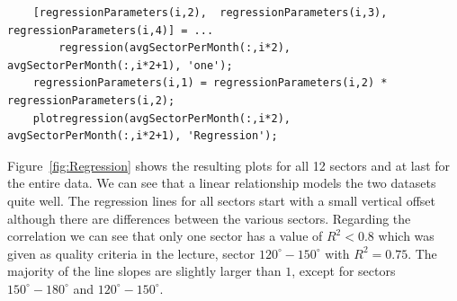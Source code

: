 \documentclass[10pt]{article}
\begin{document}
\begin{lstlisting}
    [regressionParameters(i,2),  regressionParameters(i,3), regressionParameters(i,4)] = ... 
        regression(avgSectorPerMonth(:,i*2), avgSectorPerMonth(:,i*2+1), 'one');
    regressionParameters(i,1) = regressionParameters(i,2) * regressionParameters(i,2);
    plotregression(avgSectorPerMonth(:,i*2), avgSectorPerMonth(:,i*2+1), 'Regression');
\end{lstlisting}
Figure~\ref{fig:Regression} shows the resulting plots for all 12 sectors and at last for the entire data. 
We can see that a linear relationship models the two datasets quite well. The regression lines for all sectors start with a small vertical offset although there are differences between the various sectors. Regarding the correlation we can see that only one sector has a value of $R^2 <0.8$ which was given as quality criteria in the lecture, sector $120^{\circ}-150^{\circ}$ with $R^2=0.75$. The majority of the line slopes are slightly larger than $1$, except for sectors $150^{\circ}-180^{\circ}$ and $120^{\circ}-150^{\circ}$.
\end{document}
